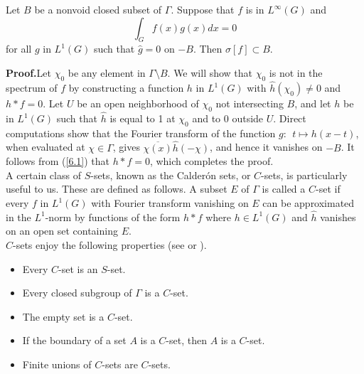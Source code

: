 \documentclass[12pt,leqno]{article}
\begin{document}
\begin{prop}
Let $B$ be a nonvoid closed subset of $\Gamma$.
Suppose that  
$f$ is in $L^\infty(G)$ and
\begin{equation}
\int_G f(x)g(x)dx=0
\label{6.1}
\end{equation}
for all $g$ in $L^1(G)$ such that $\widehat{g}= 0$ on $-B$.
Then $\sigma[f]\subset B$.
\label{prop5.2}
\end{prop}
{\bf Proof.}\quad  Let $\chi_0$ be any
element in $\Gamma\setminus B$.  We will show that
$\chi_0$ is not in the spectrum of $f$ by constructing a 
function $h$ in $L^1(G)$ with $\widehat{h}(\chi_0)\neq 0$ 
and $h*f= 0$.  Let $U$ be an open neighborhood of  
$\chi_0$ not intersecting $B$, and let $h$ be in $L^1(G)$ such that
$\widehat{h}$ is equal to 1 at $\chi_0$ and to 0 outside $U$.
Direct computations show that the Fourier transform
of the function $g:\ \ t\mapsto h(x-t)$, when evaluated at
$\chi\in\Gamma$, gives $\overline{\chi(x)}\widehat{h}(-\chi)$,
and hence it vanishes on $-B$.  
It follows from (\ref{6.1}) that $h*f= 0$, 
which completes the proof.\\


A certain class of $S$-sets, known as the 
Calder\'on sets, or $C$-sets,
is particularly useful to us.
These are defined as follows.
A subset $E$ of $\Gamma$ is 
called a $C$-set if every $f$ in 
$L^1(G)$ with Fourier transform
vanishing on $E$ can be approximated
in the $L^1$-norm by functions of the
form $h*f$ where $h\in L^1(G)$ and $\widehat{h}$ vanishes on
an open set containing $E$.  \\
$C$-sets enjoy the following properties
(see \cite[(39.39)]{hr2} or \cite[Section 7.5]{rudin}).  
\begin{itemize}
\item
Every $C$-set is an $S$-set.
\item
Every closed subgroup of $\Gamma$ is a $C$-set.
\item
The empty set is a $C$-set.    
\item
If the boundary of a set $A$ is a $C$-set,
then $A$ is a $C$-set.  
\item
Finite unions of $C$-sets are $C$-sets.
\end{itemize}
\end{document}

